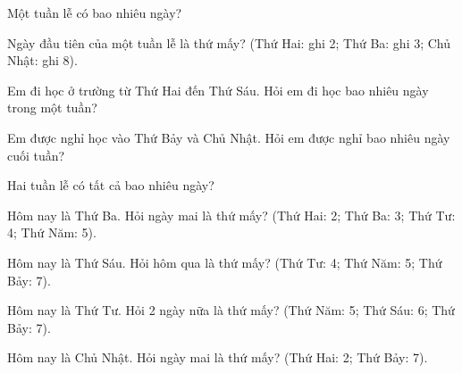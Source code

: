 \begin{ex}
Một tuần lễ có bao nhiêu ngày?
\end{ex}

\begin{ex}
Ngày đầu tiên của một tuần lễ là thứ mấy? (Thứ Hai: ghi 2; Thứ Ba: ghi 3; Chủ Nhật: ghi 8).
\end{ex}

\begin{ex}
Em đi học ở trường từ Thứ Hai đến Thứ Sáu. Hỏi em đi học bao nhiêu ngày trong một tuần?
\end{ex}

\begin{ex}
Em được nghỉ học vào Thứ Bảy và Chủ Nhật. Hỏi em được nghỉ bao nhiêu ngày cuối tuần?
\end{ex}

\begin{ex}
Hai tuần lễ có tất cả bao nhiêu ngày?
\end{ex}

\begin{ex}
Hôm nay là Thứ Ba. Hỏi ngày mai là thứ mấy? (Thứ Hai: 2; Thứ Ba: 3; Thứ Tư: 4; Thứ Năm: 5).
\end{ex}

\begin{ex}
Hôm nay là Thứ Sáu. Hỏi hôm qua là thứ mấy? (Thứ Tư: 4; Thứ Năm: 5; Thứ Bảy: 7).
\end{ex}

\begin{ex}
Hôm nay là Thứ Tư. Hỏi 2 ngày nữa là thứ mấy? (Thứ Năm: 5; Thứ Sáu: 6; Thứ Bảy: 7).
\end{ex}

\begin{ex}
Hôm nay là Chủ Nhật. Hỏi ngày mai là thứ mấy? (Thứ Hai: 2; Thứ Bảy: 7).
\end{ex}

